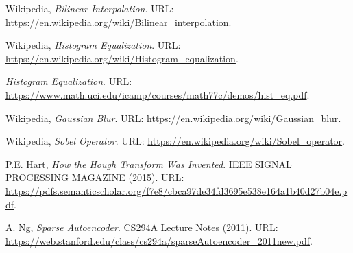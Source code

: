 \begin{thebibliography}{3}
Wikipedia,
\emph{Bilinear Interpolation}.
URL: \url{https://en.wikipedia.org/wiki/Bilinear_interpolation}.

Wikipedia,
\emph{Histogram Equalization}.
URL: \url{https://en.wikipedia.org/wiki/Histogram_equalization}.


\emph{Histogram Equalization}.
URL: \url{https://www.math.uci.edu/icamp/courses/math77c/demos/hist_eq.pdf}.


Wikipedia,
\emph{Gaussian Blur}.
URL: \url{https://en.wikipedia.org/wiki/Gaussian_blur}.


Wikipedia,
\emph{Sobel Operator}.
URL: \url{https://en.wikipedia.org/wiki/Sobel_operator}.


P.E. Hart,
\emph{How the Hough Transform Was Invented}.
IEEE SIGNAL PROCESSING MAGAZINE
(2015).
URL: \url{https://pdfs.semanticscholar.org/f7e8/cbca97de34fd3695e538e164a1b40d27b04e.pdf}.




A. Ng,
\emph{Sparse Autoencoder}.
CS294A Lecture Notes
(2011).
URL: \url{https://web.stanford.edu/class/cs294a/sparseAutoencoder_2011new.pdf}.






\end{thebibliography}
